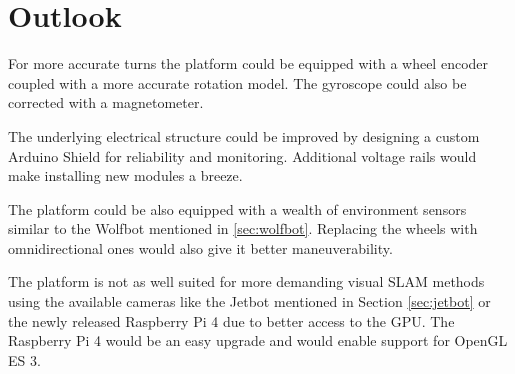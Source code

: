 \documentclass[class=report, crop=false]{standalone}
\begin{document}
\chapter{Outlook}\label{cha:outlook}

For more accurate turns the platform could be equipped with a wheel encoder  coupled with a more accurate rotation model. The gyroscope could also be corrected with a magnetometer.

The underlying electrical structure could be improved by designing a custom Arduino Shield for reliability and monitoring. Additional voltage rails would make installing new modules a breeze.

The platform could be also equipped with a wealth of environment sensors similar to the Wolfbot mentioned in \ref{sec:wolfbot}. Replacing the wheels with omnidirectional ones would also give it better maneuverability.

The platform is not as well suited for more demanding visual SLAM methods using the available cameras like the Jetbot mentioned in Section \ref{sec:jetbot} or the newly released Raspberry Pi 4 due to better access to the GPU. The Raspberry Pi 4 would be an easy upgrade and would enable support for OpenGL ES 3\footnotemark.

\end{document}
